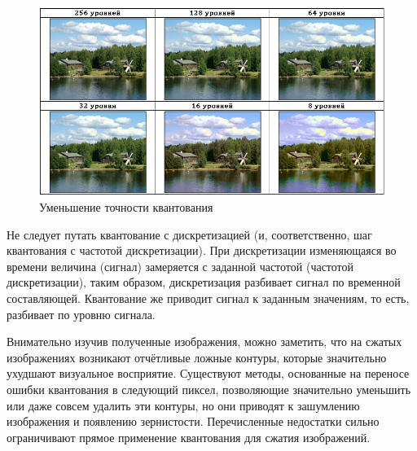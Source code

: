 \begin{figure}[H]
	\begin{center}
		\includegraphics[scale=0.85]{pics/quantization/levels_of_quantization.png}
		\caption{Уменьшение точности квантования} 
		\label{pic:levels_of_quantization}
	\end{center}
\end{figure}
Не следует путать квантование с дискретизацией (и, соответственно, шаг квантования с частотой дискретизации). При дискретизации изменяющаяся во времени величина (сигнал) замеряется с заданной частотой (частотой дискретизации), таким образом, дискретизация разбивает сигнал по временной составляющей. Квантование же приводит сигнал к заданным значениям, то есть, разбивает по уровню сигнала.

Внимательно изучив полученные изображения, можно заметить, что на сжатых изображениях возникают отчётливые ложные контуры, которые значительно ухудшают визуальное восприятие. Существуют методы, основанные на переносе ошибки квантования в следующий пиксел, позволяющие значительно уменьшить или даже совсем удалить эти контуры, но они приводят к зашумлению изображения и появлению зернистости. Перечисленные недостатки сильно ограничивают прямое применение квантования для сжатия изображений.

